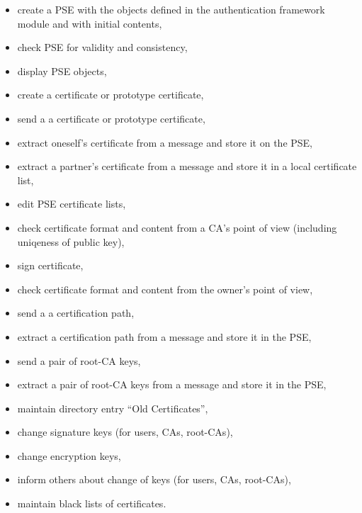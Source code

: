 \begin{itemize}
\item create a PSE
with the objects defined in the authentication framework module
and with initial contents,
\item check PSE for validity and consistency,
\item display PSE objects,
\item create a certificate or prototype certificate,
\item send a a certificate or prototype certificate,
\item extract oneself's certificate
from a message and store it on the PSE,
\item extract a partner's certificate
from a message and store it in a local certificate list,
\item edit PSE certificate lists,
\item check certificate format and content from a CA's point of view
(including uniqeness of public key),
\item sign certificate,
\item check certificate format and content from the owner's point of view,
\item send a a certification path,
\item extract a certification path
from a message and store it in the PSE,
\item send a pair of root-CA keys,
\item extract a pair of root-CA keys
from a message and store it in the PSE,
\item maintain directory entry ``Old Certificates'',
\item change signature keys (for users, CAs, root-CAs),
\item change encryption keys,
\item inform others about change of keys (for users, CAs, root-CAs),
\item maintain black lists of certificates.
\end{itemize}

